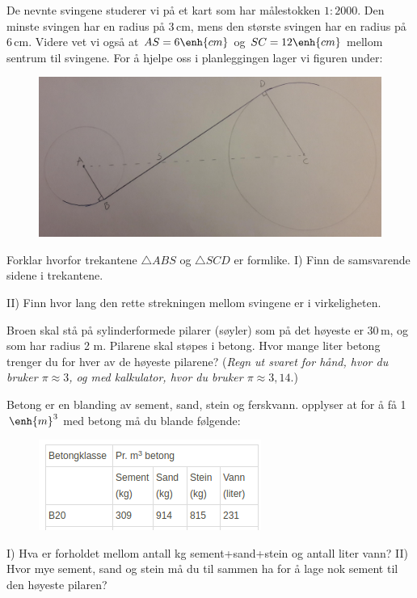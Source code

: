 \ab De nevnte svingene studerer vi på et kart som har målestokken $ 1:2000 $. Den minste svingen har en radius på 3\,cm, mens den største svingen har en radius på 6\,cm. Videre vet vi også at $ {AS=6\enh{cm}} $ og $ {SC=12\enh{cm}} $ mellom sentrum til svingene. For å hjelpe oss i planleggingen lager vi figuren under:
\begin{figure}
	\centering
	\includegraphics[scale=0.07]{fig/vei}
\end{figure}
Forklar hvorfor trekantene $ \triangle ABS $ og $ \triangle SCD $ er formlike. \os
I) Finn de samsvarende sidene i trekantene.\os

II) Finn hvor lang den rette strekningen mellom svingene er i virkeligheten.\os

\ab Broen skal stå på sylinderformede pilarer (søyler) som på det høyeste er 30\,m, og som har radius 2 m. Pilarene skal støpes i betong. Hvor mange liter betong trenger du for hver av de høyeste pilarene? (\textsl{Regn ut svaret for hånd, hvor du bruker $ {\pi\approx3} $, og med kalkulator, hvor du bruker $ {\pi\approx3,14} $}.)\vsk

\ab Betong er en blanding av sement, sand, stein og ferskvann.  opplyser at for å få 1$ \,\enh{m}^3 $ med betong må du blande følgende:\\ \begin{figure}
	\centering\includegraphics[scale=0.6]{fig/betong}
\end{figure}
I) Hva er forholdet mellom antall kg sement+sand+stein og antall liter vann?\os
II) Hvor mye sement, sand og stein må du til sammen ha for å lage nok sement til den høyeste pilaren? \os

